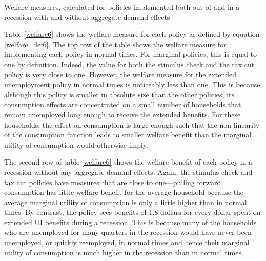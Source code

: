 \begin{table}[ht] 
	\center
	
	\caption{Welfare measures, calculated for policies implemented both out of and in a recession with and without aggregate demand effects}
	\label{welfare6}
\end{table}

Table \ref{welfare6} shows the welfare measure for each policy as defined by equation \eqref{welfare_def6}.
The top row of the table shows the welfare measure for implementing each policy in normal times.
For marginal policies, this is equal to one by definition.
Indeed, the value for both the stimulus check and the tax cut policy is very close to one.
However, the welfare measure for the extended unemployment policy in normal times is noticeably less than one.
This is because, although this policy is smaller in absolute size than the other policies, its consumption effects are concentrated on a small number of households that remain unemployed long enough to receive the extended benefits.
For these households, the effect on consumption is large enough such that the non linearity of the consumption function leads to smaller welfare benefit than the marginal utility of consumption would otherwise imply.

The second row of table \ref{welfare6} shows the welfare benefit of each policy in a recession without any aggregate demand effects.
Again, the stimulus check and tax cut policies have measures that are close to one---pulling forward consumption has little welfare benefit for the average household because the average marginal utility of consumption is only a little higher than in normal times.
By contrast, the policy sees benefits of 1.8 dollars for every dollar spent on extended UI benefits during a recession.
This is because many of the households who are unemployed for many quarters in the recession would have never been unemployed, or quickly reemployed, in normal times and hence their marginal utility of consumption is much higher in the recession than in normal times.


